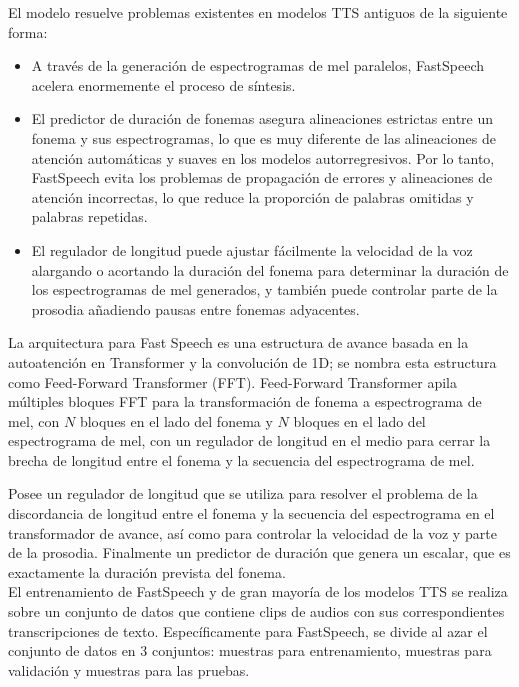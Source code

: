 El modelo resuelve problemas existentes en modelos TTS antiguos de la siguiente forma:

\begin{itemize}
	\item A través de la generación de espectrogramas de mel paralelos, FastSpeech acelera enormemente el proceso de síntesis.
	\item El predictor de duración de fonemas asegura alineaciones estrictas entre un fonema y sus espectrogramas, lo que es muy diferente de las alineaciones de atención automáticas y suaves en los modelos autorregresivos. Por lo tanto, FastSpeech evita los problemas de propagación de errores y alineaciones de atención incorrectas, lo que reduce la proporción de palabras omitidas y palabras repetidas.
	\item El regulador de longitud puede ajustar fácilmente la velocidad de la voz alargando o acortando la duración del fonema para determinar la duración de los espectrogramas de mel generados, y también puede controlar parte de la prosodia añadiendo pausas entre fonemas adyacentes.
\end{itemize}



La arquitectura para Fast Speech es una estructura de avance basada en la autoatención en Transformer y la convolución de 1D; se nombra esta estructura como Feed-Forward Transformer (FFT). Feed-Forward Transformer apila múltiples bloques FFT para la transformación de fonema a espectrograma de mel, con $N$ bloques en el lado del fonema y $N$ bloques en el lado del espectrograma de mel, con un regulador de longitud en el medio para cerrar la brecha de longitud entre el fonema y la secuencia del espectrograma de mel.

Posee un regulador de longitud que se utiliza para resolver el problema de la discordancia de longitud entre el fonema y la secuencia del espectrograma en el transformador de avance, así como para controlar la velocidad de la voz y parte de la prosodia. Finalmente un predictor de duración que genera un escalar, que es exactamente la duración prevista del fonema.\\


El entrenamiento de FastSpeech y de  gran mayoría de los modelos TTS se realiza sobre un conjunto de datos que contiene clips de audios con sus correspondientes transcripciones de texto. Específicamente para FastSpeech, se divide al azar el conjunto de datos en 3 conjuntos: muestras para entrenamiento, muestras para validación y muestras para las pruebas. \\


